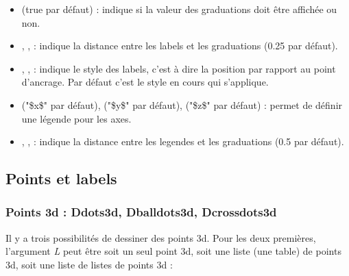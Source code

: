 \begin{itemize}
    \item {} (true par défaut) : indique si la valeur des graduations doit être affichée ou non.
    
    \item {}, ,  : indique la distance entre les labels et les graduations (0.25 par défaut).
    
    \item {}, ,  : indique le style des labels, c'est à dire la position par rapport au point d'ancrage. Par défaut c'est le style en cours qui s'applique.

    \item {} ("\$x\$" par défaut),  ("\$y\$" par défaut),  ("\$z\$" par défaut) : permet de définir une légende pour les axes.
    
    \item {}, ,  : indique la distance entre les legendes et les graduations (0.5 par défaut).     
\end{itemize}

\subsection{Points et labels}

\subsubsection{Points 3d : Ddots3d, Dballdots3d, Dcrossdots3d}

Il y a trois possibilités de dessiner des points 3d. Pour les deux premières, l'argument \emph{L} peut être soit un seul point 3d, soit une liste (une table) de points 3d, soit une liste de listes de points 3d :

